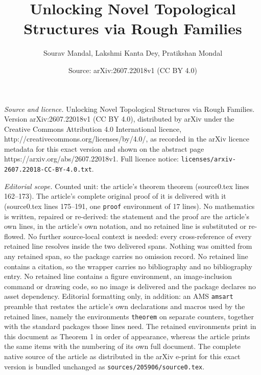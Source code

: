 \documentclass[10pt,a4paper]{amsart}
\title{Unlocking Novel Topological Structures via Rough Families}
\author{Sourav Mandal, Lakshmi Kanta Dey, Pratikshan Mondal}
\date{Source: arXiv:2607.22018v1 (CC BY 4.0)}
\begin{document}
\maketitle

\noindent\emph{Source and licence.} Unlocking Novel Topological Structures via Rough Families. Version arXiv:2607.22018v1 (CC BY 4.0), distributed by arXiv under the Creative Commons Attribution 4.0 International licence, http://creativecommons.org/licenses/by/4.0/, as recorded in the arXiv licence metadata for this exact version and shown on the abstract page https://arxiv.org/abs/2607.22018v1. Full licence notice: \texttt{licenses/arxiv-2607.22018-CC-BY-4.0.txt}.\par\smallskip

\noindent\textit{Editorial scope.} Counted unit: the article's theorem theorem (source0.tex lines 162--173). The article's complete original proof of it is delivered with it (source0.tex lines 175--191, one \texttt{proof} environment of 17 lines). No mathematics is written, repaired or re-derived: the statement and the proof are the article's own lines, in the article's own notation, and no retained line is substituted or re-flowed.  No further source-local context is needed: every cross-reference of every retained line resolves inside the two delivered spans.  Nothing was omitted from any retained span, so the package carries no omission record.  No retained line contains a citation, so the wrapper carries no bibliography and no bibliography entry.  No retained line contains a figure environment, an image-inclusion command or drawing code, so no image is delivered and the package declares no asset dependency.  Editorial formatting only, in addition: an AMS \texttt{amsart} preamble that restates the article's own declarations and macros used by the retained lines, namely the environments \texttt{theorem} on separate counters, together with the standard packages those lines need.  The retained environments print in this document as Theorem 1 in order of appearance, whereas the article prints the same items with the numbering of its own full document.  The complete native source of the article as distributed in the arXiv e-print for this exact version is bundled unchanged as \texttt{sources/205906/source0.tex}.
\end{document}
